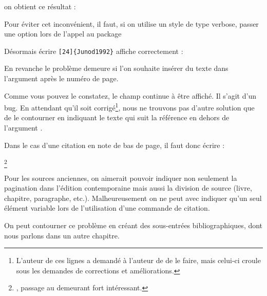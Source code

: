 on obtient ce résultat :

\begin{quotation}
\end{quotation}



Pour éviter cet inconvénient, il faut, si on utilise un style de type verbose, passer une option lors de l'appel au package 

\begin{latexcode}
\usepackage[citestyle=verbose,citepages=omit]{biblatex}
\end{latexcode}

Désormais écrire \verb|[24]{Junod1992}|
affiche correctement :

\begin{quotation}
\end{quotation}

En revanche le problème demeure si l'on souhaite insérer du texte dans l'argument  après le numéro de page.

\begin{latexcode}
\cite[\pno~24, passage au demeurant fort intéressant.]{Junod1992}
\end{latexcode}

\begin{quotation}
\cite[\pno~24, passage au demeurant fort intéressant.]{Junod1992}
\end{quotation}

Comme vous pouvez le constatez, le champ  continue à être affiché. Il s'agit d'un bug. En attendant qu'il soit corrigé\footnote{L'auteur de ces lignes a demandé à l'auteur de  de le faire, mais celui-ci croule sous les demandes de corrections et améliorations.}, nous ne trouvons pas d'autre solution que de le contourner en indiquant le texte qui suit la référence en dehors de l'argument . 

Dans le cas d'une citation en note de bas de page, il faut donc écrire :

\begin{latexcode}
\footnote{\cite[24]{Junod1992}, passage au demeurant fort intéressant.}
\end{latexcode}

\begin{attention}
Pour les sources anciennes, on aimerait pouvoir indiquer non seulement la pagination dans l'édition contemporaine mais aussi la division de source (livre, chapitre, paragraphe, etc.). Malheureusement on ne peut avec  indiquer qu'un seul élément variable lors de l'utilisation d'une commande de citation.

On peut contourner ce problème en créant des sous-entrées bibliographiques, dont nous parlons dans un autre chapitre. 
\end{attention}

